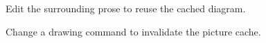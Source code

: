 \documentclass{article}
\begin{document}
Edit the surrounding prose to reuse the cached diagram.


Change a drawing command to invalidate the picture cache.
\end{document}
